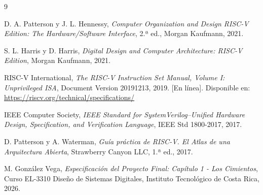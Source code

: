 \documentclass[12pt,a4paper]{article}
\begin{document}
\begin{thebibliography}{9}

D. A. Patterson y J. L. Hennessy, 
\emph{Computer Organization and Design RISC-V Edition: The Hardware/Software Interface}, 
2.ª ed., Morgan Kaufmann, 2021.

S. L. Harris y D. Harris, 
\textit{Digital Design and Computer Architecture: RISC-V Edition}, 
Morgan Kaufmann, 2021.

RISC-V International, 
\textit{The RISC-V Instruction Set Manual, Volume I: Unprivileged ISA}, 
Document Version 20191213, 2019. [En línea]. Disponible en: \url{https://riscv.org/technical/specifications/}

IEEE Computer Society, 
\textit{IEEE Standard for SystemVerilog--Unified Hardware Design, Specification, and Verification Language}, 
IEEE Std 1800-2017, 2017.

D. Patterson y A. Waterman, 
\emph{Guía práctica de RISC-V. El Atlas de una Arquitectura Abierta}, 
Strawberry Canyon LLC, 1.ª ed., 2017.

M. González Vega, 
\textit{Especificación del Proyecto Final: Capítulo 1 - Los Cimientos}, 
Curso EL-3310 Diseño de Sistemas Digitales, Instituto Tecnológico de Costa Rica, 2026.

\end{thebibliography}
\end{document}
